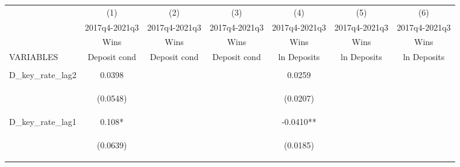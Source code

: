 \documentclass[]{article}
\begin{document}
\begin{center}
\begin{tabular}{lcccccc} \hline
 & (1) & (2) & (3) & (4) & (5) & (6) \\
 & 2017q4-2021q3 & 2017q4-2021q3 & 2017q4-2021q3 & 2017q4-2021q3 & 2017q4-2021q3 & 2017q4-2021q3 \\
 & Wins & Wins & Wins & Wins & Wins & Wins \\
VARIABLES & Deposit cond & Deposit cond & Deposit cond & ln Deposits & ln Deposits & ln Deposits \\ \hline
\vspace{4pt} & \begin{footnotesize}\end{footnotesize} & \begin{footnotesize}\end{footnotesize} & \begin{footnotesize}\end{footnotesize} & \begin{footnotesize}\end{footnotesize} & \begin{footnotesize}\end{footnotesize} & \begin{footnotesize}\end{footnotesize} \\
D\_key\_rate\_lag2 & 0.0398 &  &  & 0.0259 &  &  \\
\vspace{4pt} & \begin{footnotesize}(0.0548)\end{footnotesize} & \begin{footnotesize}\end{footnotesize} & \begin{footnotesize}\end{footnotesize} & \begin{footnotesize}(0.0207)\end{footnotesize} & \begin{footnotesize}\end{footnotesize} & \begin{footnotesize}\end{footnotesize} \\
D\_key\_rate\_lag1 & 0.108* &  &  & -0.0410** &  &  \\
\vspace{4pt} & \begin{footnotesize}(0.0639)\end{footnotesize} & \begin{footnotesize}\end{footnotesize} & \begin{footnotesize}\end{footnotesize} & \begin{footnotesize}(0.0185)\end{footnotesize} & \begin{footnotesize}\end{footnotesize} & \begin{footnotesize}\end{footnotesize} \\

\end{tabular}
\end{center}
\end{document}
